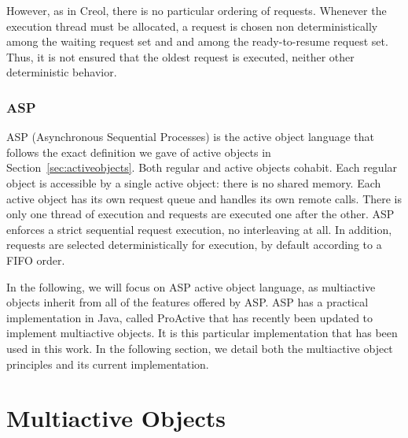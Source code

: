 \documentclass[11pt]{report}
\begin{document}
However, as in Creol, there is no particular ordering of requests. Whenever the execution thread must be allocated, a request is chosen non deterministically among the waiting request set and and among the ready-to-resume request set. 
Thus, it is not ensured that the oldest request is executed, neither other deterministic behavior.

\subsubsection{ASP}
ASP (Asynchronous Sequential Processes) \cite{ref:asp} is the active object language that follows the exact definition we gave of active objects in Section~\ref{sec:activeobjects}. Both regular and active objects cohabit. Each regular object is accessible by a single active object: there is no shared memory. Each active object has its own request queue and handles its own remote calls. There is only one thread of execution and requests are executed one after the other. ASP enforces a strict sequential request execution, no interleaving at all.
In addition, requests are selected deterministically for execution, by default according to a FIFO order. 

In the following, we will focus on  ASP active object language, as multiactive objects inherit from all of the features offered by ASP. ASP has a practical implementation in Java, called ProActive \cite{ref:proactive} that has recently been updated to implement multiactive objects. It is this particular implementation that has been used in this work. In the following section, we detail both the multiactive object principles and its current implementation.


\section{Multiactive Objects}
\end{document}
